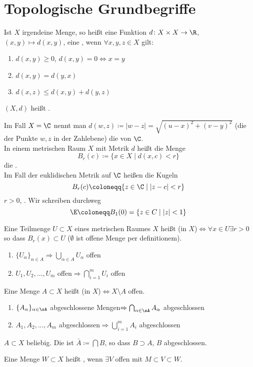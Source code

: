\chapter{Topologische Grundbegriffe}
\begin{definition}
Ist $ X $ irgendeine Menge, so hei\ss t eine Funktion $ d\colon X\times X\rightarrow\R $, $ (x,y)\mapsto d(x,y) $, eine , wenn $ \forall x,y,z\in X $ gilt:
\begin{enumerate}
\item $ d(x,y)\geq 0 $, $ d(x,y)=0\Leftrightarrow x=y $
\item $ d(x,y)=d(y,x) $
\item $ d(x,z)\leq d(x,y)+d(y,z) $
\end{enumerate}
$ (X,d) $ hei\ss t .
\end{definition}Im Fall $ X=\C $ nennt man $ d(w,z)\coloneqq |w-z|=\sqrt{(u-x)^2+(v-y)^2} $ (die  der Punkte $ w,z $ in der Zahlebene) die  von $ \C $.\\
In einem metrischen Raum $ X $ mit Metrik $ d $ hei\ss t die Menge \[ B_r(c)\coloneqq\lbrace x\in X\mid d(x,c)<r\rbrace \] die .\\
Im Fall der euklidischen Metrik auf $ \C $ hei\ss en die Kugeln \[ B_r(c)\coloneqq\lbrace z\in\C\mid |z-c|<r\rbrace \] $ r>0 $, . Wir schreiben durchweg \[ \E\coloneqq B_1(0)=\lbrace z\in C\mid |z|<1\rbrace \]
\begin{definition}
Eine Teilmenge $ U\subset X $ eines metrischen Raumes $ X $ hei\ss t  (in $ X $)$ \Leftrightarrow\forall x\in U\exists r>0 $ so dass $ B_r(x)\subset U $ ($ \emptyset $ ist offene Menge per definitionem).
\begin{enumerate}
\item $ \lbrace U_\alpha\rbrace_{\alpha\in A}\Rightarrow\bigcup_{\alpha\in A}U_\alpha $ offen
\item $ U_1,U_2,...,U_m $ offen$ \Rightarrow\bigcap_{i=1}^m U_i $ offen
\end{enumerate}
\end{definition}
\begin{definition}
Eine Menge $ A\subset X $ hei\ss t  (in $ X $)$ \Leftrightarrow X\setminus A$ offen.
\begin{enumerate}
\item $ \lbrace A_\alpha\rbrace_{\alpha\in\sA} $ abgeschlossene Mengen$ \Rightarrow\bigcap_{\alpha\in\sA} A_\alpha$ abgeschlossen
\item $ A_1,A_2,...,A_m $ abgeschlossen$ \Rightarrow\bigcup_{i=1}^m A_i $ abgeschlossen
\end{enumerate}
\end{definition}
\begin{definition}
$ A\subset X $ beliebig. Die  ist $ \bar A\coloneqq\bigcap B $, so dass $ B\supset A $, $ B $ abgeschlossen. 
\end{definition}
Eine Menge $ W\subset X $ hei\ss t , wenn $ \exists V $ offen mit $ M\subset V\subset W $.
